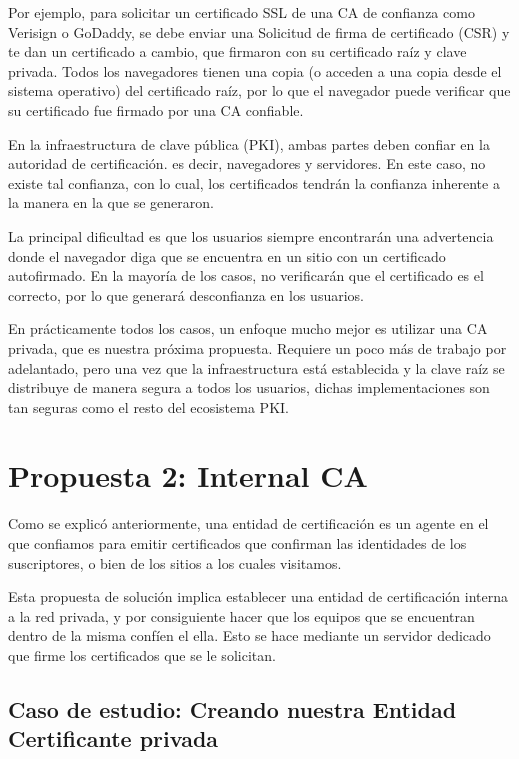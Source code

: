 Por ejemplo, para solicitar un certificado SSL de una CA de confianza como Verisign o 
GoDaddy, se debe enviar una Solicitud de firma de certificado (CSR) y te dan un 
certificado a cambio, que firmaron con su certificado raíz y clave privada. Todos 
los navegadores tienen una copia (o acceden a una copia desde el sistema operativo) 
del certificado raíz, por lo que el navegador puede verificar que su certificado 
fue firmado por una CA confiable.

En la infraestructura de clave pública (PKI), ambas partes deben confiar en la autoridad 
de certificación. es decir, navegadores y servidores. En este caso, no existe tal confianza, 
con lo cual, los certificados tendrán la confianza inherente a la manera en la que se generaron.

La principal dificultad es que los usuarios siempre encontrarán una advertencia 
donde el navegador diga que se encuentra en un sitio con un certificado autofirmado. 
En la mayoría de los casos, no verificarán que el certificado es el correcto, por 
lo que generará desconfianza en los usuarios.

En prácticamente todos los casos, un enfoque mucho mejor es utilizar una CA privada, 
que es nuestra próxima propuesta. Requiere un poco más de trabajo por adelantado, 
pero una vez que la infraestructura está establecida y la clave raíz se distribuye 
de manera segura a todos los usuarios, dichas implementaciones son tan seguras como 
el resto del ecosistema PKI.

\section{Propuesta 2: Internal CA}

Como se explicó anteriormente, una entidad de certificación es un agente en el que 
confiamos para emitir 
certificados que confirman las identidades de los suscriptores, o bien de los 
sitios a los cuales visitamos. 

Esta propuesta de solución implica establecer una entidad de certificación interna 
a la red privada, y por consiguiente hacer que los equipos que se encuentran 
dentro de la misma confíen el ella. Esto se hace 
mediante un servidor dedicado que firme los certificados que se le solicitan.




\subsection{Caso de estudio: Creando nuestra Entidad Certificante privada}



